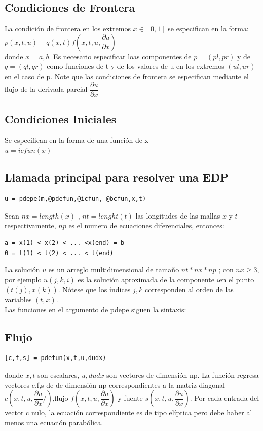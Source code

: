 \documentclass[10pt,a4paper]{article}
\begin{document}
\subsection{Condiciones de Frontera}
La condición de frontera en los extremos $x \in [0,1]$ se especifican en la forma:\\
$p(x,t,u) + q(x,t) f(x,t,u,\dfrac{\partial u}{\partial x})$\\
donde $x= a,b$. Es necesario especificar loas componentes de $p = (pl, pr)$ y de $q = (ql,qr)$ como funciones de t y de los valores de u en los extremos $(ul,ur)$ en el caso de p. Note que las condiciones de frontera se especifican mediante el flujo de la derivada parcial $\dfrac{\partial u}{\partial x}$
\subsection{Condiciones Iniciales}
Se especifican en la forma de una función de x\\
$u = icfun(x)$
\subsection{Llamada principal para resolver una EDP}
\begin{verbatim}
u = pdepe(m,@pdefun,@icfun, @bcfun,x,t)
\end{verbatim}
Sean $nx = length(x)$ , $nt = lenght(t)$ las longitudes de las mallas $x$ y $t$ respectivamente, $np$ es el numero de ecuaciones diferenciales, entonces:
\begin{verbatim}
a = x(1) < x(2) < ... <x(end) = b
0 = t(1) < t(2) < ... < t(end)
\end{verbatim}
La solución $u$ es un arreglo multidimensional de tamaño $nt * nx * np$ ; con $nx \geq 3$, por ejemplo $u(j,k,i)$ es la solución aproximada de la componente $i$en el punto $(t(j),x(k))$.
Nótese que los índices $j,k$ corresponden al orden de las variables $(t,x)$.\\
Las funciones en el argumento de pdepe siguen la sintaxis:
\subsection{Flujo} 
\begin{verbatim}
[c,f,s] = pdefun(x,t,u,dudx)
\end{verbatim}
donde $x, t$ son escalares, $u, dudx$ son vectores de dimensión np. La función regresa
vectores c,f,s de de dimensión np correspondientes a la matriz diagonal $c(x,t,u,\dfrac{\partial u}{\partial x} / )$,flujo $f(x,t,u ,\dfrac{\partial u}{\partial x} )$ y fuente $s(x,t,u , \dfrac{\partial u}{\partial x} )$. Por cada entrada del vector c nulo, la ecuación correspondiente es de tipo elíptica pero debe haber al menos una ecuación parabólica.
\end{document}
